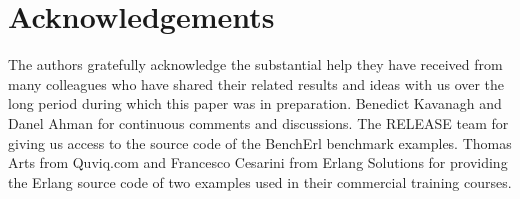 \documentclass{sig-alternate}
\begin{document}






\section{Acknowledgements}

The authors gratefully acknowledge the substantial help they have received from 
many colleagues who have shared their related results and ideas with us over 
the long period during which this paper was in preparation.  
Benedict Kavanagh and Danel Ahman for continuous comments and discussions.
The RELEASE team for giving us access to the source code of the BenchErl 
benchmark examples.  Thomas Arts from Quviq.com and Francesco Cesarini from 
Erlang Solutions for providing the Erlang source code of two examples used in their 
commercial training courses.



%
%
\end{document}
